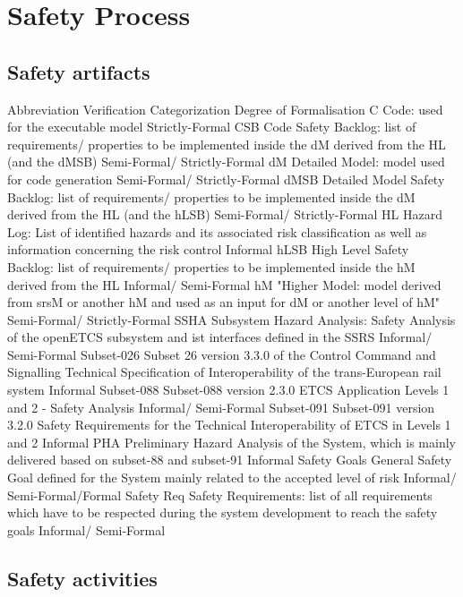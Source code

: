 \documentclass{template/openetcs_article}
\begin{document}

\section{Safety Process}



\subsection{Safety artifacts}

Abbreviation	Verification Categorization	Degree of Formalisation
C	Code: used for the executable model	Strictly-Formal
CSB	Code Safety Backlog: list of requirements/ properties to be implemented inside the dM derived from  the HL (and the dMSB)	Semi-Formal/ Strictly-Formal
dM	Detailed Model: model used for code generation	Semi-Formal/ Strictly-Formal
dMSB	Detailed Model Safety Backlog: list of requirements/ properties to be implemented inside the dM derived from the HL (and  the hLSB)	Semi-Formal/ Strictly-Formal
HL	Hazard Log: List of identified hazards and its associated risk classification as well as information concerning the risk control	Informal
hLSB	High Level Safety Backlog: list of requirements/ properties to be implemented inside the hM derived from the HL	Informal/ Semi-Formal
hM	"Higher Model: model derived from srsM or another hM 
and used as an input for dM or another level of hM"	Semi-Formal/ Strictly-Formal
SSHA	Subsystem Hazard Analysis: Safety Analysis of the openETCS subsystem and ist interfaces defined in the SSRS	Informal/ Semi-Formal
Subset-026	Subset 26 version 3.3.0 of the Control Command and Signalling Technical Specification of Interoperability of the trans-European rail system	Informal
Subset-088	Subset-088 version 2.3.0 ETCS Application Levels 1 and 2 - Safety Analysis	Informal/ Semi-Formal
Subset-091	Subset-091 version 3.2.0 Safety Requirements for the Technical Interoperability of ETCS in Levels 1 and 2	Informal
PHA	Preliminary Hazard Analysis of the System, which is mainly delivered based on subset-88 and subset-91	Informal
Safety Goals	General Safety Goal defined for the System mainly related to the accepted level of risk	Informal/ Semi-Formal/Formal
Safety Req	Safety Requirements: list of all requirements which have to be respected during the system development to reach the safety goals	Informal/ Semi-Formal

\subsection{Safety activities}
\end{document}

